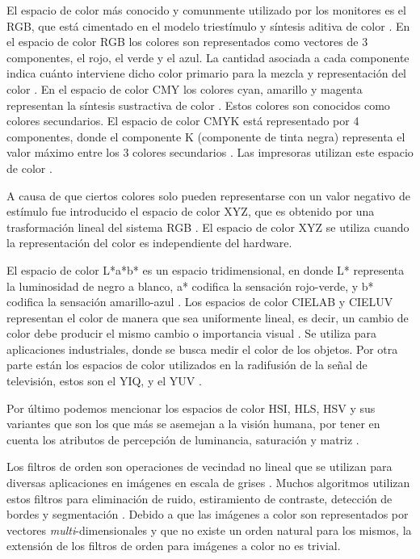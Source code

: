 El espacio de color m\'as conocido y comunmente utilizado por los monitores es el RGB, que est\'a cimentado en el modelo triest\'imulo y s\'intesis aditiva de color \cite{busin2008color}. En el espacio de color RGB los colores son representados como vectores de 3 componentes, el rojo, el verde y el azul. La cantidad asociada a cada componente indica cu\'anto interviene dicho color primario para la mezcla y representaci\'on del color \cite{tkalcic2003colour}. En el espacio de color CMY los colores cyan, amarillo y magenta  representan la s\'intesis sustractiva de color \cite{rolleston1996color}.  Estos colores son conocidos como colores secundarios. El espacio de color CMYK est\'a representado por 4 componentes, donde el componente K (componente de tinta negra) representa el valor m\'aximo entre los 3 colores secundarios \cite{tkalcic2003colour}. Las impresoras utilizan este espacio de color \cite{rolleston1996color}. 

A causa de que ciertos colores solo pueden representarse con un valor negativo de est\'imulo fue introducido el espacio de color XYZ, que es obtenido por una trasformaci\'on lineal del sistema RGB \cite{ortiz2002procesamiento}. El espacio de color XYZ se utiliza cuando la representaci\'on del color es independiente del hardware.

El espacio de color L*a*b* es un espacio tridimensional, en donde L* representa la luminosidad de negro a blanco, a* codifica la sensaci\'on rojo-verde, y b* codifica la sensaci\'on amarillo-azul \cite{leon2006color}. 
Los espacios de color CIELAB y CIELUV representan el color de manera que sea uniformente lineal, es decir, un cambio de color debe producir el mismo cambio o importancia visual \cite{mahy1994evaluation}. Se utiliza para aplicaciones industriales, donde se busca medir el color de los objetos.  Por otra parte est\'an los espacios de color utilizados en la radifusi\'on de la se\~nal de televisi\'on, estos son el YIQ, y el YUV \cite{munson1995color}.

Por \'ultimo podemos mencionar los espacios de color HSI, HLS, HSV y sus variantes que son los que m\'as se asemejan a la visi\'on humana, por tener en cuenta los atributos de percepci\'on de luminancia, saturaci\'on y matriz \cite{zamora2001comparative}.

Los filtros de orden son operaciones de vecindad no lineal que se utilizan para diversas aplicaciones en im\'agenes en escala de grises \cite{pitas1992order}. Muchos algoritmos utilizan estos filtros para eliminaci\'on de ruido, estiramiento de contraste, detecci\'on de bordes y segmentaci\'on \cite{ortiz2002procesamiento}.  Debido a que las im\'agenes a color son representados por vectores \textit{multi}-dimensionales y que no existe un orden natural para los mismos, la extensi\'on de los filtros de orden para im\'agenes a color no es trivial. 

